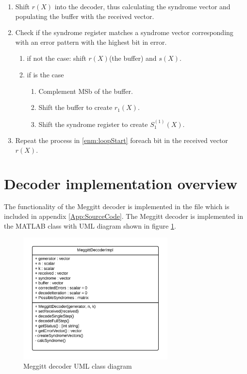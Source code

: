 \documentclass[Main]{subfiles}
\begin{document}
\begin{enumerate}
\item Shift $r(X)$ into the decoder, thus calculating the syndrome vector and populating the buffer with the received vector.
\item \label{enm:loopStart} Check if the syndrome register matches a syndrome vector corresponding with an error pattern with the highest bit in error.
\begin{enumerate}
\item if not the case: shift $r(X)$(the buffer) and $s(X)$.
\item if is the case
\begin{enumerate}
\item Complement MSb of the buffer.
\item Shift the buffer to create $r_1(X)$.
\item Shift the syndrome register to create $S_1^{(1)}(X)$.
\end{enumerate}
\end{enumerate}
\item Repeat the process in \ref{enm:loopStart} foreach bit in the received vector $r(X)$.
\end{enumerate}

\section{Decoder implementation overview}

The functionality of the Meggitt decoder is implemented in the file  which is included in appendix \ref{App:SourceCode}. The Meggitt decoder is implemented in the MATLAB class  with UML diagram shown in figure \ref{fig:meggittUML}.

\begin{figure}[h]
    \centering
    \includegraphics[width=0.7\textwidth]{figures/MeggitDecoderUML}
    \caption{Meggitt decoder UML class diagram}
    \label{fig:meggittUML}
\end{figure}
\end{document}

